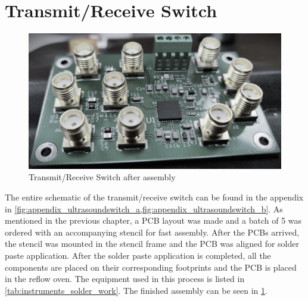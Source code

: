 \section{Transmit/Receive Switch}
\begin{figure}[htbp]
	\centering
	\includegraphics[width=.8\textwidth]{Figures/4_switch_pcb_pic.jpg}
	\caption[Transmit/Receive Switch after assembly]{Transmit/Receive Switch after assembly}
	\label{fig:4_txrx_pcb}
\end{figure}
The entire schematic of the transmit/receive switch can be found in the appendix in \cref{fig:appendix_ultrasoundswitch_a,fig:appendix_ultrasoundswitch_b}. As mentioned in the previous chapter, a PCB layout was made and a batch of 5 was ordered with an accompanying stencil for fast assembly. After the PCBs arrived, the stencil was mounted in the stencil frame and the PCB was aligned for solder paste application. After the solder paste application is completed, all the components are placed on their corresponding footprints and the PCB is placed in the reflow oven. The equipment used in this process is listed in \cref{tab:instruments_solder_work}. The finished assembly can be seen in \cref{fig:4_txrx_pcb}.


